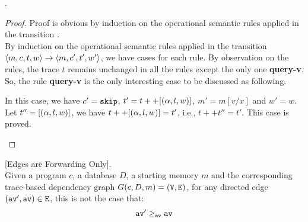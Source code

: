 \documentclass[a4paper,11pt]{article}
\begin{document}
%
%
\begin{lem}
.
\\
\end{lem}
%
\begin{proof}
{
Proof is obvious by induction on the operational semantic rules applied in the transition 
.
\\
By induction on the operational semantic rules applied in the transition $\langle m, c, t, w \rangle 
\rightarrow
\langle m, c', t', w' \rangle$, 
we have cases for each rule.
By observation on the rules, 
the trace $t$ remains unchanged in all the rules except the only one \textbf{query-v}.
So, the rule \textbf{query-v} is the only interesting case to be discussed as following.
\begin{itemize}
\caseL{
\[
	\inferrule
	{
	\query(\qval) = v
	}
	{
	\config{m, [\assign{x}{\query(\qval)}]^l, t, w} \xrightarrow{}  
	\config{m, \eskip, t ++ [(\qval, l, w)], w}
	}
	~\textbf{query-v}
\]
}
%
In this case, we have $c' = \mathtt{skip}$, 
$t' = t ++ [(\alpha, l, w)]$, $m' = m[v/x]$ and $w' = w$.
\\
Let $t'' = [(\alpha, l, w)]$, we have $t ++ [(\alpha, l, w)] = t'$,
i.e., $t ++ t'' = t'$. This case is proved.
\end{itemize}
}
\end{proof}
%
%
\begin{lem}
\label{lem:edgeforwarding}
[Edges are Forwarding Only].
\\
%
{
Given a program $c$, a database $D$, a starting memory $m$ and the corresponding trace-based dependency graph $G(c,D,m) = (\mathtt{V}, \mathtt{E})$, 
for any directed edge $(\mathtt{av}', \mathtt{av}) \in \mathtt{E}$, 
this is not the case that:
%
$$\mathtt{av}' \geq_{\mathtt{av}} \mathtt{av}$$
%
}
\end{lem}
\end{document}
